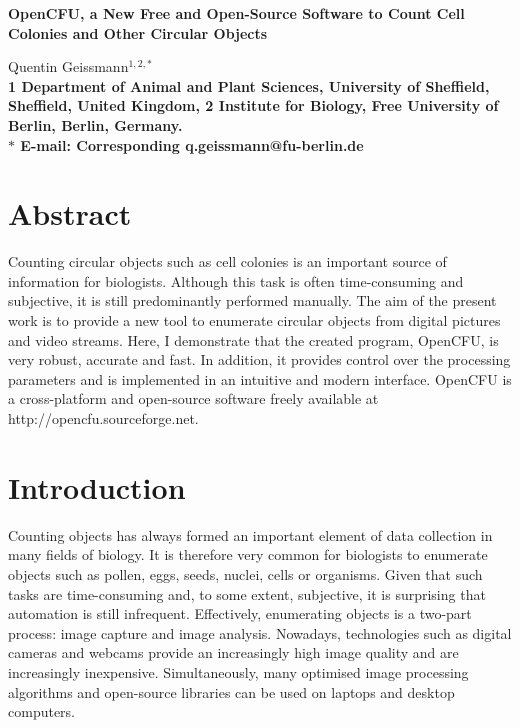 \documentclass[10pt]{article}
\date{}
\newcommand{\website}{http://opencfu.sourceforge.net}
\begin{document}

\begin{flushleft}
{\Large
\textbf{OpenCFU, a New Free and Open-Source Software to Count Cell Colonies and
Other Circular Objects}}

Quentin Geissmann$^{1,2,\ast}$
\\


\bf{1} Department of Animal and Plant Sciences, University of Sheffield,
Sheffield, United Kingdom, \bf{2} Institute for Biology, Free University of 
Berlin, Berlin, Germany. \\ $\ast$ E-mail: Corresponding
q.geissmann@fu-berlin.de
\end{flushleft}

\section*{Abstract}

Counting circular objects such as cell colonies is an important source of
information for biologists.
Although this task is often time-consuming and subjective, it is still
predominantly performed manually. The aim of the present work is to provide a
new tool to enumerate circular objects from digital pictures and video streams.
Here, I demonstrate that the created program, OpenCFU, is very robust, accurate and
fast. In addition, it provides control over the processing parameters and is
implemented in an intuitive and modern interface. OpenCFU is a cross-platform
and open-source software freely available at \website{}.

\section*{Introduction}

Counting objects has always formed an important element of data collection in
many fields of biology.
It is therefore very common for
biologists to enumerate objects such as pollen\cite{costa_counting_2009},
eggs\cite{mello_image_2008}, seeds\cite{severini_counting_2011},
nuclei\cite{forero_deadeasy_2010}, cells\cite{kachouie_arraycount_2009} or organisms\cite{yati_flycounter:_2011}.
Given that
such tasks are time-consuming and, to some extent, subjective, it is
surprising that automation is still infrequent. 
Effectively, enumerating objects is a two-part process: image capture and image
analysis. Nowadays, technologies such as digital cameras and webcams provide
an increasingly high image quality and are increasingly inexpensive.
Simultaneously, many optimised image processing
algorithms and open-source libraries can be used on laptops
and desktop computers.
\end{document}
